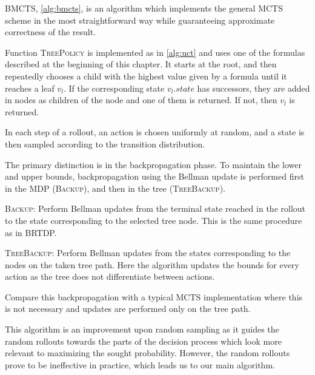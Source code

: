 BMCTS, \autoref{alg:bmcts}, is an algorithm which implements the general
MCTS scheme in the most straightforward way while guaranteeing
approximate correctness of the result.

Function \textsc{TreePolicy} is implemented as in
\autoref{alg:uct} and uses one of the formulas
described at the beginning of this chapter. It starts at the root, and
then repeatedly chooses a child with the highest value given by a
formula until it reaches a leaf $v_l$. If the corresponding state
$v_l.state$ has successors, they are added in nodes as children of the
node and one of them is returned. If not, then $v_l$ is returned.

In each step of a rollout, an action is chosen
uniformly at random, and a state is then sampled according to the
transition distribution.

The primary distinction is in the backpropagation phase. To maintain the lower
and upper bounds, backpropagation using the Bellman update is performed
first in the MDP (\textsc{Backup}), and then in the tree (\textsc{TreeBackup}).

\textsc{Backup}: Perform Bellman updates from the terminal state reached in the
rollout to the state corresponding to the selected tree node. This is
the same procedure as in BRTDP.

\textsc{TreeBackup}: Perform Bellman updates from the states
corresponding to the nodes on the taken tree path. Here the algorithm
updates the bounds for every action as the tree does not differentiate
between actions.

Compare this backpropagation with a typical MCTS implementation where
this is not necessary and updates are performed only on the tree path.


This algorithm is an improvement upon random sampling as it guides the
random rollouts towards the parts of the decision process which look
more relevant to maximizing the sought probability. However, the random
rollouts prove to be ineffective in practice, which leads us to our main
algorithm.

\newpage

